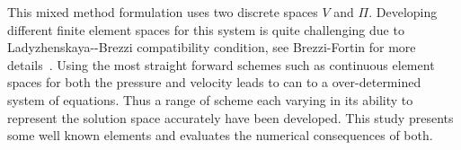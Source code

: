 This mixed method formulation uses two discrete spaces $V$ and $\Pi$.
Developing different finite element spaces for this system is quite challenging
due to Ladyzhenskaya-\babuska-Brezzi compatibility condition, see
Brezzi-Fortin for more details~\cite{Brezzi1974aFortin1991}.  Using the
most straight forward schemes such as continuous element spaces for both the
pressure and velocity leads to can to a over-determined system of equations.
Thus a range of scheme each varying in its ability to represent the solution
space accurately have been developed. This study presents some well known
elements and evaluates the numerical consequences of both.

\begin{figure}
  \centering
  \hspace{2em}

\end{figure}
